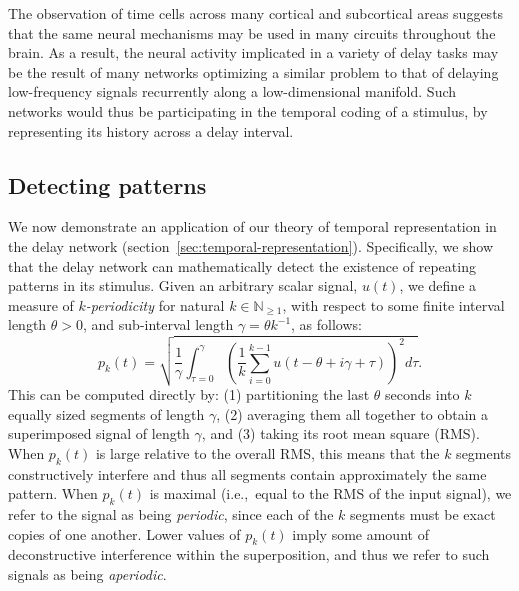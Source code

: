 The observation of time cells across many cortical and subcortical areas suggests that the same neural mechanisms may be used in many circuits throughout the brain.
As a result, the neural activity implicated in a variety of delay tasks may be the result of many networks optimizing a similar problem to that of delaying low-frequency signals recurrently along a low-dimensional manifold.
Such networks would thus be participating in the temporal coding of a stimulus, by representing its history across a delay interval.

\subsection{Detecting patterns}
\label{sec:periodicity}

We now demonstrate an application of our theory of temporal representation in the delay network (section~\ref{sec:temporal-representation}).
Specifically, we show that the delay network can mathematically detect the existence of repeating patterns in its stimulus.
Given an arbitrary scalar signal, $u(t)$, we define a measure of \emph{$k$-periodicity} for natural $k \in \mathbb{N}_{\ge 1}$, with respect to some finite interval length $\theta > 0$, and sub-interval length $\gamma = \theta k^{-1}$, as follows:
\begin{equation} \label{eq:periodicity}
p_k(t) = \sqrt{ \frac{1}{\gamma} \int_{\tau=0}^{\gamma} \left( \frac{1}{k} \sum_{i=0}^{k-1} u \left( t - \theta + i \gamma + \tau \right) \right)^2 d\tau } \text{.}
\end{equation}
This can be computed directly by: (1) partitioning the last $\theta$ seconds into $k$ equally sized segments of length $\gamma$, (2) averaging them all together to obtain a superimposed signal of length $\gamma$, and (3) taking its root mean square (RMS).
When $p_k(t)$ is large relative to the overall RMS, this means that the $k$ segments constructively interfere and thus all segments contain approximately the same pattern. 
When $p_k(t)$ is maximal (i.e.,~equal to the RMS of the input signal), we refer to the signal  as being \emph{periodic}, since each of the $k$ segments must be exact copies of one another.
Lower values of $p_k(t)$ imply some amount of deconstructive interference within the superposition, and thus we refer to such signals as being \emph{aperiodic}.


